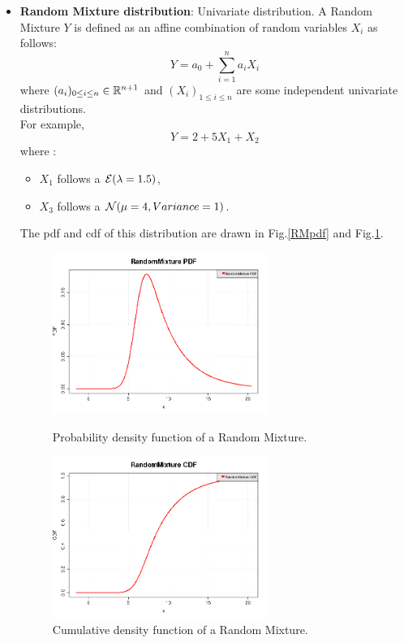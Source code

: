 {\begin{itemize}
\item {\bf Random Mixture distribution}: Univariate distribution. A Random Mixture $Y$ is defined as an affine combination of random variables $X_i$ as follows:
\begin{equation}
\displaystyle Y = a_0 + \sum_{i=1}^n a_i X_i
\end{equation}
where $(a_i)_{ 0 \leq i \leq n} \in {\mathbb R}^{n+1}$ and $(X_i)_{ 1 \leq i \leq n}$ are some independent univariate distributions.\\
For example,
\begin{equation}
Y = 2 + 5X_1 + X_2
\end{equation}
where :
\begin{itemize}
\item  $X_1$ follows a ${\mathcal E}(\lambda = 1.5)$,
\item  $X_3$ follows a ${\mathcal N}(\mu = 4,Variance = 1)$.
\end{itemize}
The pdf and cdf of this distribution are drawn in Fig.\ref{RMpdf} and Fig.\ref{RMcdf}.


\begin{figure}[H]
\begin{minipage}{8cm}
\begin{center}
\includegraphics[width=7cm]{Figures/RandomMixture_pdf.png}
\caption{Probability density function of a Random Mixture.}
\label{RMpdf}
\end{center}
\end{minipage}
\hfill
\begin{minipage}{8cm}
\begin{center}
\includegraphics[width=7cm]{Figures/RandomMixture_cdf.png}
\caption{Cumulative density function of a Random Mixture.}
\label{RMcdf}
\end{center}
\end{minipage}
\end{figure}






\end{itemize}}
